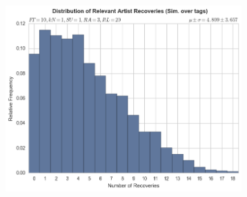 \documentclass[12pt]{article}
\begin{document}
\begin{figure}[h!]
\begin{subfigure}
  \end{subfigure}
  \begin{subfigure}
      \centering
    \includegraphics[height=2.8in]{tags,FT=10,kN=1,SU=1,RA=3,RL=20.png}
  \end{subfigure}
\end{figure}
\end{document}
